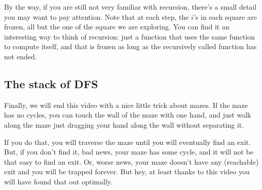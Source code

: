 \documentclass[12pt]{article}
\begin{document}
By the way, if you are still not very familiar with recursion, there's a small
detail you may want to pay attention. Note that at each step, the $i$'s in each
square are frozen, all but the one of the square we are exploring. You can find it
an interesting way to think of recursion: just a function that uses the same function to compute itself, and that is frozen as long as the recursively called function
has not ended.


\subsection{The stack of DFS}

Finally, we will end this video with a nice little trick about mazes. If
the maze has no cycles, you can touch the wall of the maze with one hand,
and just walk along the maze just dragging your hand along the wall without
separating it.

If you do that, you will traverse the maze until you will eventually find
an exit. But, if you don't find it, bad news, your maze has some cycle, and it
will not be that easy to find an exit. Or, worse news, your maze doesn't have any (reachable) exit
and you will be trapped forever. But hey, at least thanks to this video you will have found that
out optimally.
\end{document}
